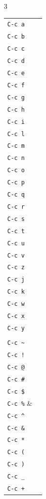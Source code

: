 \documentclass[11pt,landscape,a4paper]{article}
\begin{document}
\begin{multicols}{3}
\begin{tabular}{@{}ll@{}}
	{\color{darkred}\verb|C-c a|} & \\
	{\color{darkred}\verb|C-c b|} & \\
	{\color{darkred}\verb|C-c c|} & \\
	{\color{darkred}\verb|C-c d|} & \\
	{\color{darkred}\verb|C-c e|} & \\
	{\color{darkred}\verb|C-c f|} & \\
	{\color{darkred}\verb|C-c g|} & \\
	{\color{darkred}\verb|C-c h|} & \\
	{\color{darkred}\verb|C-c i|} & \\
	{\color{darkred}\verb|C-c l|} & \\
	{\color{darkred}\verb|C-c m|} & \\
	{\color{darkred}\verb|C-c n|} & \\
	{\color{darkred}\verb|C-c o|} & \\
	{\color{darkred}\verb|C-c p|} & \\
	{\color{darkred}\verb|C-c q|} & \\
	{\color{darkred}\verb|C-c r|} & \\
	{\color{darkred}\verb|C-c s|} & \\
	{\color{darkred}\verb|C-c t|} & \\
	{\color{darkred}\verb|C-c u|} & \\
	{\color{darkred}\verb|C-c v|} & \\
	{\color{darkred}\verb|C-c z|} & \\
	{\color{darkred}\verb|C-c j|} & \\
	{\color{darkred}\verb|C-c k|} & \\
	{\color{darkred}\verb|C-c w|} & \\
	{\color{darkred}\verb|C-c x|} & \\
	{\color{darkred}\verb|C-c y|} & \\
	\\
	{\color{darkred}\verb|C-c ~|} & \\
	{\color{darkred}\verb|C-c !|} & \\
	{\color{darkred}\verb|C-c @|} & \\
	{\color{darkred}\verb|C-c #|} & \\
	{\color{darkred}\verb|C-c $|} & \\
	{\color{darkred}\verb|C-c %|} & \\
	{\color{darkred}\verb|C-c ^|} & \\
	{\color{darkred}\verb|C-c &|} & \\
	{\color{darkred}\verb|C-c *|} & \\
	{\color{darkred}\verb|C-c (|} & \\
	{\color{darkred}\verb|C-c )|} & \\
	{\color{darkred}\verb|C-c _|} & \\
	{\color{darkred}\verb|C-c +|} & \\
\end{tabular}


\end{multicols}
\end{document}
